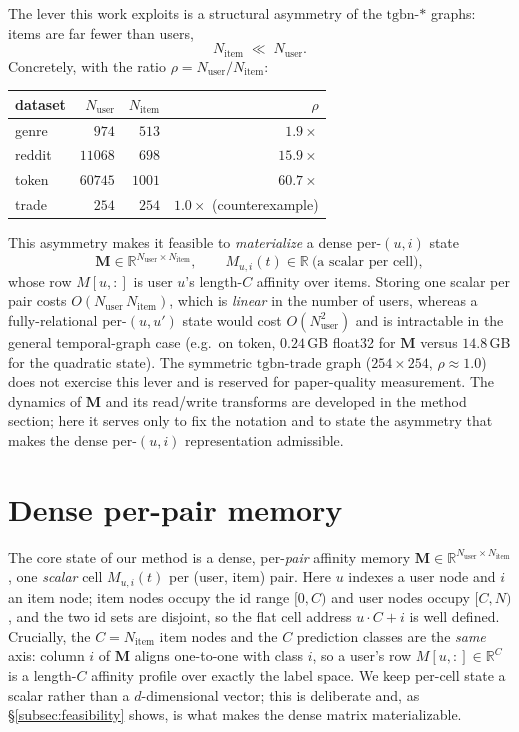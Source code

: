 \documentclass[11pt]{article}
\begin{document}
The lever this work exploits is a structural asymmetry of the $\mathrm{tgbn}$-$*$
graphs: items are far fewer than users,
\begin{equation}
  N_{\text{item}} \;\ll\; N_{\text{user}}.
\end{equation}
Concretely, with the ratio $\rho = N_{\text{user}}/N_{\text{item}}$:
\begin{center}
\begin{tabular}{lrrr}
\hline
dataset & $N_{\text{user}}$ & $N_{\text{item}}$ & $\rho$ \\
\hline
genre  & $974$   & $513$  & $1.9\times$ \\
reddit & $11068$ & $698$  & $15.9\times$ \\
token  & $60745$ & $1001$ & $60.7\times$ \\
trade  & $254$   & $254$  & $1.0\times$ (counterexample) \\
\hline
\end{tabular}
\end{center}
This asymmetry makes it feasible to \emph{materialize} a dense per-$(u,i)$ state
\begin{equation}
  \mathbf{M}\in\mathbb{R}^{N_{\text{user}}\times N_{\text{item}}},
  \qquad M_{u,i}(t)\in\mathbb{R}\ \text{(a scalar per cell)},
\end{equation}
whose row $M[u,:]$ is user $u$'s length-$C$ affinity over items. Storing one
scalar per pair costs $O(N_{\text{user}}\,N_{\text{item}})$, which is
\emph{linear} in the number of users, whereas a fully-relational per-$(u,u')$
state would cost $O(N_{\text{user}}^2)$ and is intractable in the general
temporal-graph case (e.g.\ on token, $0.24$\,GB float32 for $\mathbf{M}$ versus
$14.8$\,GB for the quadratic state). The symmetric $\mathrm{tgbn}$-$\mathrm{trade}$
graph ($254\times254$, $\rho\approx1.0$) does not exercise this lever and is
reserved for paper-quality measurement. The dynamics of $\mathbf{M}$ and its
read/write transforms are developed in the method section; here it serves only
to fix the notation and to state the asymmetry that makes the dense
per-$(u,i)$ representation admissible.

\section{Dense per-pair memory}
\label{sec:dense-per-pair-memory}

The core state of our method is a dense, per-\emph{pair} affinity memory
$\mathbf{M}\in\mathbb{R}^{N_{\text{user}}\times N_{\text{item}}}$, one \emph{scalar}
cell $M_{u,i}(t)$ per (user, item) pair. Here $u$ indexes a user node and $i$ an
item node; item nodes occupy the id range $[0,C)$ and user nodes occupy $[C,N)$,
and the two id sets are disjoint, so the flat cell address $u\cdot C + i$ is
well defined. Crucially, the $C=N_{\text{item}}$ item nodes and the $C$ prediction
classes are the \emph{same} axis: column $i$ of $\mathbf{M}$ aligns one-to-one with
class $i$, so a user's row $M[u,:]\in\mathbb{R}^{C}$ is a length-$C$ affinity
profile over exactly the label space. We keep per-cell state a scalar rather than a
$d$-dimensional vector; this is deliberate and, as \S\ref{subsec:feasibility}
shows, is what makes the dense matrix materializable.
\end{document}
